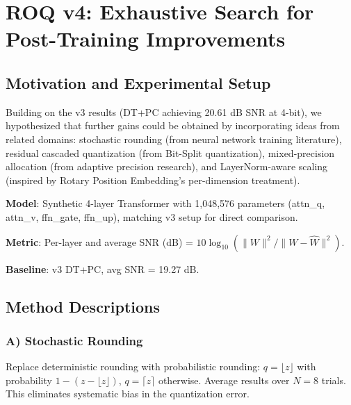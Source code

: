 
\section{ROQ v4: Exhaustive Search for Post-Training Improvements}
\label{sec:v4}

\subsection{Motivation and Experimental Setup}

Building on the v3 results (DT+PC achieving 20.61 dB SNR at 4-bit),
we hypothesized that further gains could be obtained by incorporating
ideas from related domains: stochastic rounding (from neural network
training literature), residual cascaded quantization (from Bit-Split
quantization), mixed-precision allocation (from adaptive precision
research), and LayerNorm-aware scaling (inspired by Rotary Position
Embedding's per-dimension treatment).

\textbf{Model}: Synthetic 4-layer Transformer with 1,048,576 parameters
(attn\_q, attn\_v, ffn\_gate, ffn\_up), matching v3 setup for direct
comparison.

\textbf{Metric}: Per-layer and average SNR (dB) = $10 \log_{10}(\|W\|^2 / \|W - \hat{W}\|^2)$.

\textbf{Baseline}: v3 DT+PC, avg SNR = 19.27 dB.

\subsection{Method Descriptions}

\subsubsection{A) Stochastic Rounding}
Replace deterministic rounding with probabilistic rounding:
$q = \lfloor z \rfloor$ with probability $1 - (z - \lfloor z \rfloor)$,
$q = \lceil z \rceil$ otherwise. Average results over $N=8$ trials.
This eliminates systematic bias in the quantization error.

